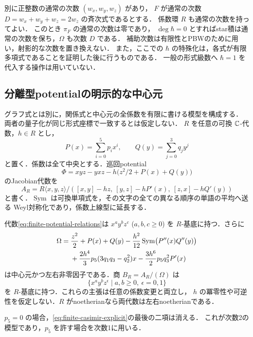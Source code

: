 \begin{remark}[通常の次数と有限パラメータ]
\label{rem:finite-ordinary-grading}
別に正整数の通常の次数 $(w_x,w_y,w_z)$ があり，
$F$ が通常の次数 $D=w_x+w_y+w_z=2w_z$ の斉次式であるとする．
係数環 $R$ も通常の次数を持ってよい．
このとき $\pi_F$ の通常の次数は零であり，
$\deg\hbar=0$ とすればstar積は通常の次数を保ち，$\Omega$ も次数 $D$ である．
補助次数は有限性とPBWのために用い，射影的な次数を置き換えない．
また，ここでの $\hbar$ の特殊化は，各式が有限多項式であることを証明した後に行うものである．
一般の形式級数へ $\hbar=1$ を代入する操作は用いていない．
\end{remark}

\subsection{分離型potentialの明示的な中心元}
\label{subsec:explicit-finite-potential}

グラフ式とは別に，関係式と中心元の全係数を有限に書ける模型を構成する．
両者の量子化が同じ形式座標で一致するとは仮定しない．
$R$ を任意の可換 $\mathbb C$-代数，$h\in R$ とし，
\[
 P(x)=\sum_{i=0}^{5}p_i x^i,\qquad
 Q(y)=\sum_{j=0}^{3}q_j y^j
\]
と置く．係数は全て中央とする．巡回potential
\[
 \Phi=xyz-yxz-h\bigl(z^2/2+P(x)+Q(y)\bigr)
\]
のJacobian代数を
\begin{equation}
 A_R=R\langle x,y,z\rangle/
 ([x,y]-hz,\ [y,z]-hP'(x),\ [z,x]-hQ'(y))
 \label{eq:finite-potential-relations}
\end{equation}
と書く．$\operatorname{Sym}$ は可換単項式を，その文字の全ての異なる順序の単語の平均へ送る
Weyl対称化であり，係数上線型に延長する．

\begin{theorem}[両次数の普遍PBW族と有限Casimir公式]
\label{thm:explicit-finite-pbw-casimir}
代数\eqref{eq:finite-potential-relations}は
$x^a y^b z^c$ ($a,b,c\ge0$) を $R$-基底に持つ．さらに
\begin{align}
 \Omega={}&\frac{z^2}{2}+P(x)+Q(y)
       -\frac{h^2}{12}\operatorname{Sym}\bigl(P''(x)Q''(y)\bigr)\notag\\
 &+\frac{2h^4}{3}p_5(3q_1q_3-q_2^2)x
       -\frac{3h^6}{2}p_5q_3^2P'(x)
 \label{eq:finite-casimir-explicit}
\end{align}
は中心元かつ左右非零因子である．商 $B_R=A_R/(\Omega)$ は
\[
 \{x^a y^b z^\epsilon\mid a,b\ge0,\ \epsilon=0,1\}
\]
を $R$-基底に持つ．これらの主張は任意の係数変更と両立し，
$h$ の冪零性や可逆性を仮定しない．$R$ がnoetherianなら両代数は左右noetherianである．

$p_5=0$ の場合，\eqref{eq:finite-casimir-explicit}の最後の二項は消える．
これが次数2の模型であり，$p_5$ を許す場合を次数1に用いる．
\end{theorem}

